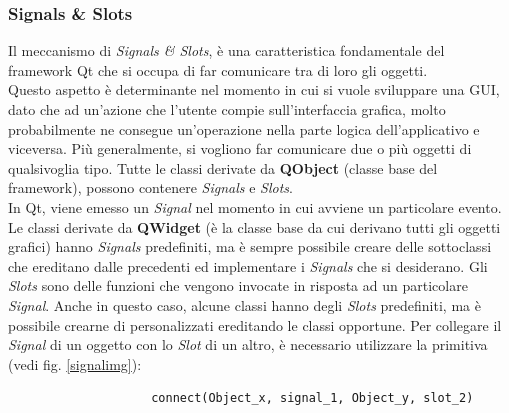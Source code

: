	\subsubsection{Signals \& Slots}
	\label{signalslot}
	Il meccanismo di \textit{Signals \& Slots}\glossario{}, è una caratteristica fondamentale del framework\g{} Qt\glossario{} che si occupa di far comunicare tra di loro gli oggetti.\\
	Questo aspetto è determinante nel momento in cui si vuole sviluppare una GUI\glossario{}, dato che ad un'azione che l'utente compie sull'interfaccia grafica, molto probabilmente ne consegue un'operazione nella parte logica dell'applicativo e viceversa. Più generalmente, si vogliono far comunicare due o più oggetti di qualsivoglia tipo. Tutte le classi derivate da \textbf{QObject} (classe base del framework\glossario{}), possono contenere \textit{Signals}\glossario{} e \textit{Slots}\glossario{}.
	\\In Qt\glossario{}, viene emesso un \textit{Signal}\glossario{} nel momento in cui avviene un particolare evento. Le classi derivate da \textbf{QWidget} (è la classe base da cui derivano tutti gli oggetti grafici) hanno \textit{Signals}\glossario{} predefiniti, ma è sempre possibile creare delle sottoclassi che ereditano dalle precedenti ed implementare i \textit{Signals}\glossario{} che si desiderano. Gli \textit{Slots}\glossario{} sono delle funzioni che vengono invocate in risposta ad un particolare \textit{Signal}\glossario{}. Anche in questo caso, alcune classi hanno degli \textit{Slots}\glossario{} predefiniti, ma è possibile crearne di personalizzati ereditando le classi opportune.
	Per collegare il \textit{Signal}\glossario{} di un oggetto con lo \textit{Slot}\glossario{} di un altro, è necessario utilizzare la primitiva (vedi fig. \ref{signalimg}):
	\begin{verbatim}
					connect(Object_x, signal_1, Object_y, slot_2)
	\end{verbatim}
